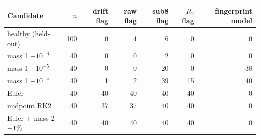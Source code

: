 \begin{tabular}{lrrrrrr}
\toprule
Candidate & $n$ & drift flag & raw flag & sub8 flag & $R_2$ flag & fingerprint model \\
\midrule
healthy (held-out) & 100 & 0 & 4 & 6 & 0 & 0 \\
mass 1 $+10^{-6}$ & 40 & 0 & 0 & 2 & 0 & 0 \\
mass 1 $+10^{-5}$ & 40 & 0 & 0 & 20 & 0 & 38 \\
mass 1 $+10^{-4}$ & 40 & 1 & 2 & 39 & 15 & 40 \\
Euler & 40 & 40 & 40 & 40 & 40 & 0 \\
midpoint RK2 & 40 & 37 & 37 & 40 & 40 & 0 \\
Euler + mass 2 $+1\%$ & 40 & 40 & 40 & 40 & 40 & 0 \\
\bottomrule
\end{tabular}
